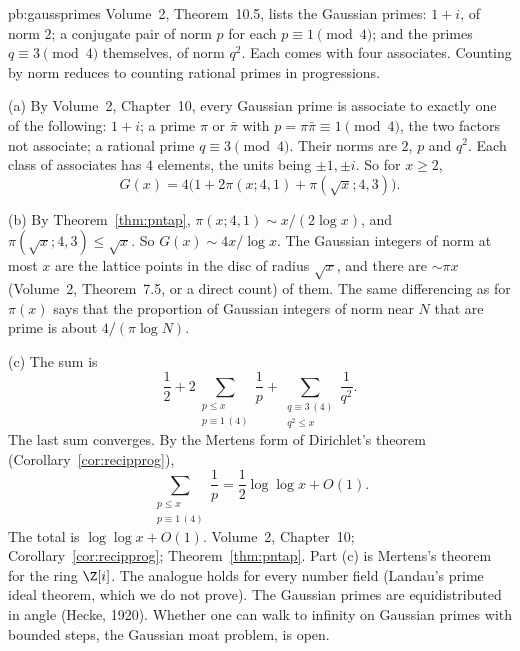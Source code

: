 \begin{solution}{pb:gaussprimes}
\idea Volume~2, Theorem~10.5, lists the Gaussian primes: $1+i$, of norm $2$; a conjugate pair of norm $p$ for each $p\equiv1\pmod4$; and the primes $q\equiv3\pmod4$ themselves, of norm $q^2$. Each comes with four associates. Counting by norm reduces to counting rational primes in progressions.

\writeup (a) By Volume~2, Chapter~10, every Gaussian prime is associate to exactly one of the following: $1+i$; a prime $\pi$ or $\bar\pi$ with $p=\pi\bar\pi\equiv1\pmod4$, the two factors not associate; a rational prime $q\equiv3\pmod4$. Their norms are $2$, $p$ and $q^2$. Each class of associates has $4$ elements, the units being $\pm1,\pm i$. So for $x\ge2$,
\[
G(x)=4\bigl(1+2\pi(x;4,1)+\pi(\sqrt x;4,3)\bigr).
\]

(b) By Theorem~\ref{thm:pntap}, $\pi(x;4,1)\sim x/(2\log x)$, and $\pi(\sqrt x;4,3)\le\sqrt x$. So $G(x)\sim 4x/\log x$. The Gaussian integers of norm at most $x$ are the lattice points in the disc of radius $\sqrt x$, and there are $\sim\pi x$ (Volume~2, Theorem~7.5, or a direct count) of them. The same differencing as for $\pi(x)$ says that the proportion of Gaussian integers of norm near $N$ that are prime is about $4/(\pi\log N)$.

(c) The sum is
\[
\frac12+2\sum_{\substack{p\le x\\p\equiv1\,(4)}}\frac1p+\sum_{\substack{q\equiv3\,(4)\\q^2\le x}}\frac1{q^2}.
\]
The last sum converges. By the Mertens form of Dirichlet's theorem (Corollary~\ref{cor:recipprog}),
\[
\sum_{\substack{p\le x\\p\equiv1\,(4)}}\frac1p=\frac12\log\log x+O(1).
\]
The total is $\log\log x+O(1)$.
\tools Volume~2, Chapter~10; Corollary~\ref{cor:recipprog}; Theorem~\ref{thm:pntap}.
\leads Part (c) is Mertens's theorem for the ring $\Z[i]$. The analogue holds for every number field (Landau's prime ideal theorem, which we do not prove). The Gaussian primes are equidistributed in angle (Hecke, 1920). Whether one can walk to infinity on Gaussian primes with bounded steps, the Gaussian moat problem, is open.
\end{solution}

